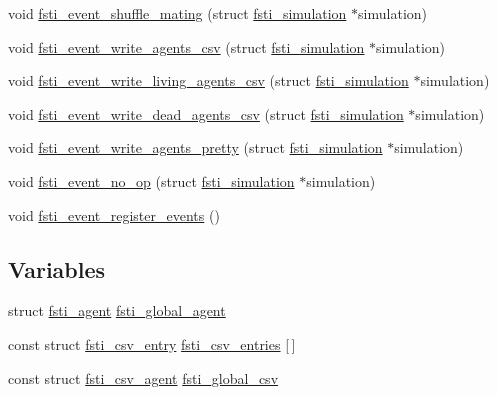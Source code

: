 \begin{DoxyCompactItemize}
\item 
void \mbox{\hyperlink{fsti-events_8h_ab545cb3f26c790e61b15ac12eb06558b}{fsti\+\_\+event\+\_\+shuffle\+\_\+mating}} (struct \mbox{\hyperlink{structfsti__simulation}{fsti\+\_\+simulation}} $\ast$simulation)
\item 
void \mbox{\hyperlink{fsti-events_8h_a181109be936c367859d70b6072941f55}{fsti\+\_\+event\+\_\+write\+\_\+agents\+\_\+csv}} (struct \mbox{\hyperlink{structfsti__simulation}{fsti\+\_\+simulation}} $\ast$simulation)
\item 
void \mbox{\hyperlink{fsti-events_8h_a465aa2a48afeb4e334293b212ce04758}{fsti\+\_\+event\+\_\+write\+\_\+living\+\_\+agents\+\_\+csv}} (struct \mbox{\hyperlink{structfsti__simulation}{fsti\+\_\+simulation}} $\ast$simulation)
\item 
void \mbox{\hyperlink{fsti-events_8h_a5375a8b4dc64d91ce44f0dfc2d95754a}{fsti\+\_\+event\+\_\+write\+\_\+dead\+\_\+agents\+\_\+csv}} (struct \mbox{\hyperlink{structfsti__simulation}{fsti\+\_\+simulation}} $\ast$simulation)
\item 
void \mbox{\hyperlink{fsti-events_8h_a2c63cd8d9c1bfb4dad965bf690654e25}{fsti\+\_\+event\+\_\+write\+\_\+agents\+\_\+pretty}} (struct \mbox{\hyperlink{structfsti__simulation}{fsti\+\_\+simulation}} $\ast$simulation)
\item 
void \mbox{\hyperlink{fsti-events_8h_a0b16ba18abc845d1dea58d355498b991}{fsti\+\_\+event\+\_\+no\+\_\+op}} (struct \mbox{\hyperlink{structfsti__simulation}{fsti\+\_\+simulation}} $\ast$simulation)
\item 
void \mbox{\hyperlink{fsti-events_8h_a0922fc7e9d2a95b59e3f1df672f3bdc4}{fsti\+\_\+event\+\_\+register\+\_\+events}} ()
\end{DoxyCompactItemize}
\subsection*{Variables}
\begin{DoxyCompactItemize}
\item 
struct \mbox{\hyperlink{structfsti__agent}{fsti\+\_\+agent}} \mbox{\hyperlink{fsti-events_8h_a0c5214ba8681a0691658466b19dde4d5}{fsti\+\_\+global\+\_\+agent}}
\item 
const struct \mbox{\hyperlink{structfsti__csv__entry}{fsti\+\_\+csv\+\_\+entry}} \mbox{\hyperlink{fsti-events_8h_a7101c8980d633b64a8060f6f91c48dcd}{fsti\+\_\+csv\+\_\+entries}} \mbox{[}$\,$\mbox{]}
\item 
const struct \mbox{\hyperlink{structfsti__csv__agent}{fsti\+\_\+csv\+\_\+agent}} \mbox{\hyperlink{fsti-events_8h_a7f2bcfae00114763a58e88a609eacf3e}{fsti\+\_\+global\+\_\+csv}}
\end{DoxyCompactItemize}


